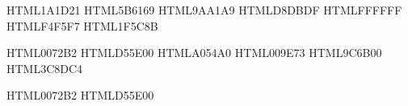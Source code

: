 
\usepackage[T1]{fontenc}
\usepackage[utf8]{inputenc}
\usepackage{libertinus-type1}
\usepackage[scaled=0.82]{beramono}
\usepackage{microtype}
\usepackage{amsmath}

\usepackage[
  a4paper,
  top=28mm, bottom=28mm, inner=30mm, outer=26mm,
  marginparwidth=0mm, footskip=14mm
]{geometry}

\usepackage{graphicx}
\graphicspath{{./}{figures/}{figures/generated/}}
\usepackage{xcolor}
\usepackage{booktabs}
\usepackage{tabularx}
\usepackage{longtable}
\usepackage{multirow}
\usepackage{array}
\usepackage{float}
\usepackage{caption}
\usepackage{subcaption}
\usepackage{enumitem}
\usepackage{fancyhdr}
\setlength{\headheight}{14pt}
\usepackage{titlesec}
\usepackage{listings}
\usepackage{tikz}
\usepackage{pgfplots}
\pgfplotsset{compat=1.18}
\usetikzlibrary{positioning,arrows.meta,calc,fit,backgrounds,shapes.geometric}

\usepackage[hidelinks]{hyperref}
\usepackage[nameinlink]{cleveref}

\definecolor{ink}       {HTML}{1A1D21}
\definecolor{ink60}     {HTML}{5B6169}
\definecolor{ink30}     {HTML}{9AA1A9}
\definecolor{rule}      {HTML}{D8DBDF}
\definecolor{paper}     {HTML}{FFFFFF}
\definecolor{wash}      {HTML}{F4F5F7}
\definecolor{accent}    {HTML}{1F5C8B}

\definecolor{catA} {HTML}{0072B2}
\definecolor{catB} {HTML}{D55E00}
\definecolor{catC} {HTML}{A054A0}
\definecolor{catD} {HTML}{009E73}
\definecolor{catE} {HTML}{9C6B00}
\definecolor{catF} {HTML}{3C8DC4}

\definecolor{studioC} {HTML}{0072B2}
\definecolor{agentC} {HTML}{D55E00}

